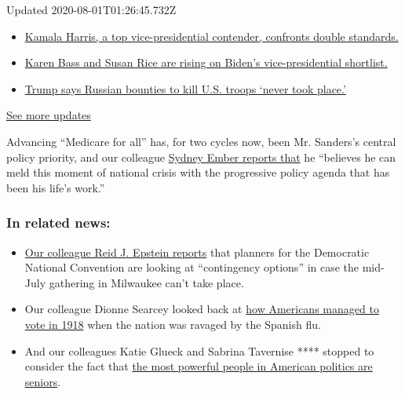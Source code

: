 Updated 2020-08-01T01:26:45.732Z

\begin{itemize}
\tightlist
\item
  \href{https://www.nytimes.com/2020/07/31/us/elections/biden-vs-trump.html?action=click\&pgtype=Article\&state=default\&region=MAIN_CONTENT_1\&context=storylines_live_updates\#link-29fdff45}{Kamala
  Harris, a top vice-presidential contender, confronts double
  standards.}
\item
  \href{https://www.nytimes.com/2020/07/31/us/elections/biden-vs-trump.html?action=click\&pgtype=Article\&state=default\&region=MAIN_CONTENT_1\&context=storylines_live_updates\#link-13ec3d9c}{Karen
  Bass and Susan Rice are rising on Biden's vice-presidential
  shortlist.}
\item
  \href{https://www.nytimes.com/2020/07/31/us/elections/biden-vs-trump.html?action=click\&pgtype=Article\&state=default\&region=MAIN_CONTENT_1\&context=storylines_live_updates\#link-49e9a016}{Trump
  says Russian bounties to kill U.S. troops `never took place.'}
\end{itemize}

\href{https://www.nytimes.com/2020/07/31/us/elections/biden-vs-trump.html?action=click\&pgtype=Article\&state=default\&region=MAIN_CONTENT_1\&context=storylines_live_updates}{See
more updates}

Advancing ``Medicare for all'' has, for two cycles now, been Mr.
Sanders's central policy priority, and our colleague
\href{https://www.nytimes.com/2020/03/26/us/politics/bernie-sanders-coronavirus.html}{Sydney
Ember reports that} he ``believes he can meld this moment of national
crisis with the progressive policy agenda that has been his life's
work.''

\hypertarget{in-related-news}{%
\subsubsection{In related news:}\label{in-related-news}}

\begin{itemize}
\item
  \href{https://www.nytimes.com/2020/03/23/us/politics/democratic-convention-milwaukee-coronavirus.html}{Our
  colleague Reid J. Epstein reports} that planners for the Democratic
  National Convention are looking at ``contingency options'' in case the
  mid-July gathering in Milwaukee can't take place.
\item
  Our colleague Dionne Searcey looked back at
  \href{https://www.nytimes.com/2020/03/21/us/politics/1918-flu-pandemic-elections.html}{how
  Americans managed to vote in 1918} when the nation was ravaged by the
  Spanish flu.
\item
  And our colleagues Katie Glueck and Sabrina Tavernise **** stopped to
  consider the fact that
  \href{https://www.nytimes.com/2020/03/27/us/politics/biden-trump-seniors.html}{the
  most powerful people in American politics are seniors}.
\end{itemize}

